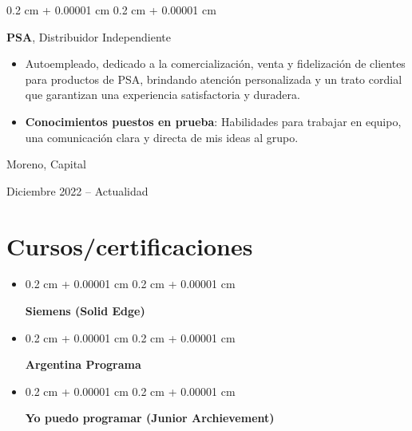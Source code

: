 \documentclass[10pt, letterpaper]{article}
\newenvironment{highlights}{
    \begin{itemize}[
        topsep=0.10 cm,
        parsep=0.10 cm,
        partopsep=0pt,
        itemsep=0pt,
        leftmargin=0.4 cm + 10pt
    ]
}{
    \end{itemize}
} %
\newenvironment{onecolentry}{
    \begin{adjustwidth}{
        0.2 cm + 0.00001 cm
    }{
        0.2 cm + 0.00001 cm
    }
}{
    \end{adjustwidth}
} %
\newenvironment{twocolentry}[2][]{
    \onecolentry
    \def\secondColumn{#2}
    \setcolumnwidth{\fill, 4.5 cm}
    \begin{paracol}{2}
}{
    \switchcolumn \raggedleft \secondColumn
    \end{paracol}
    \endonecolentry
} %
\begin{document}
        \begin{twocolentry}{
            Moreno, Capital

        Diciembre 2022 – Actualidad
        }
            \textbf{PSA}, Distribuidor Independiente
            \begin{highlights}
                \item Autoempleado, dedicado a la comercialización, venta y fidelización de clientes para productos de PSA, brindando atención personalizada y un trato cordial que garantizan una experiencia satisfactoria y duradera.
                \item \textbf{Conocimientos puestos en prueba}: Habilidades para trabajar en equipo, una comunicación clara y directa de mis ideas al grupo. 
            \end{highlights}
        \end{twocolentry}



    \section{Cursos/certificaciones}

        \begin{highlights}
            
            \item \begin{onecolentry}
                 \textbf{Siemens (Solid Edge)} 
            \end{onecolentry}
        
            \item \begin{onecolentry}
                \textbf{Argentina Programa}
            \end{onecolentry}

             \item \begin{onecolentry}
                \textbf{Yo puedo programar (Junior Archievement)} 
            \end{onecolentry}
        
    
        \end{highlights}
\end{document}
